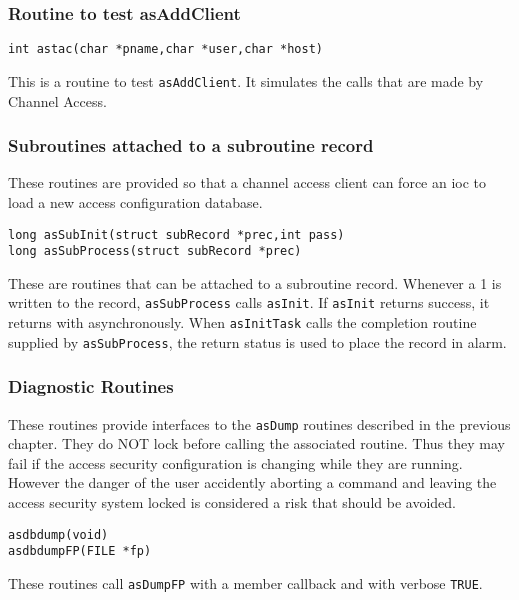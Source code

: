 \subsubsection{Routine to test asAddClient}

\begin{verbatim}int astac(char *pname,char *user,char *host)
\end{verbatim}This is a routine to test \verb|asAddClient|. It simulates the calls that are made by Channel Access.

\subsubsection{Subroutines attached to a subroutine record}

These routines are provided so that a channel access client can force an ioc to load a new access configuration database.

\begin{verbatim}long asSubInit(struct subRecord *prec,int pass)
long asSubProcess(struct subRecord *prec)
\end{verbatim}
These are routines that can be attached to a subroutine record. Whenever a 1 is written to the record, \verb|asSubProcess| 
calls \verb|asInit|. If \verb|asInit| returns success, it returns with asynchronously. When \verb|asInitTask| calls the completion 
routine supplied by \verb|asSubProcess|, the return status is used to place the record in alarm.

\subsubsection{Diagnostic Routines}

These routines provide interfaces to the \verb|asDump| routines described in the previous chapter. They do NOT lock before 
calling the associated routine. Thus they may fail if the access security configuration is changing while they are running. 
However the danger of the user accidently aborting a command and leaving the access security system locked is 
considered a risk that should be avoided.

\begin{verbatim}asdbdump(void)
asdbdumpFP(FILE *fp)
\end{verbatim}
These routines call \verb|asDumpFP| with a member callback and with verbose \verb|TRUE|.



